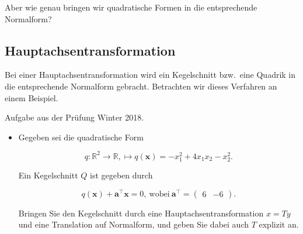\begin{figure}[h]
\begin{minipage}{0.32\textwidth}
    \end{minipage}
\end{figure}

Aber wie genau bringen wir quadratische Formen in die entsprechende Normalform?

\subsection{Hauptachsentransformation}

Bei einer Hauptachsentransformation wird ein Kegelschnitt bzw.\ eine Quadrik in die entsprechende Normalform gebracht. Betrachten wir dieses Verfahren an einem Beispiel. 

\vspace{1\baselineskip}

Aufgabe aus der Prüfung Winter 2018. 
\begin{itemize}
    \item Gegeben sei die quadratische Form 

    \begin{equation*}
        q: \mathbb{R}^2 \to \mathbb{R}, \mapsto q(\mathbf{x})=-x_1^2+4x_1x_2-x_2^2.
    \end{equation*}

    Ein Kegelschnitt \( Q \) ist gegeben durch 

    \begin{equation*}
        q(\mathbf{x}) + \mathbf{a}^\top \mathbf{x} = 0, \ \text{wobei} \ \mathbf{a}^\top = \begin{pmatrix} 6 & -6 \end{pmatrix}.
    \end{equation*}

    Bringen Sie den Kegelschnitt durch eine Hauptachsentransformation \( x = Ty \) und eine Translation auf Normalform, und geben Sie dabei auch \( T \) explizit an. 

\end{itemize}

